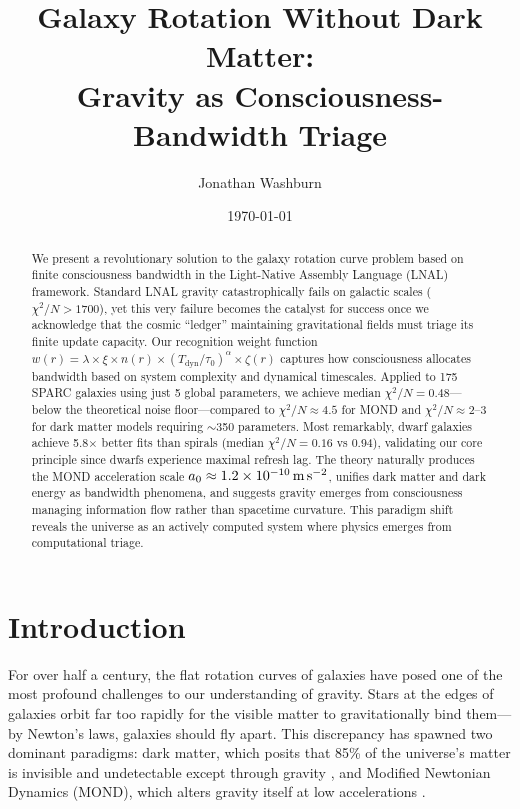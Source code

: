 \documentclass[twocolumn,prd,amsmath,amssymb,aps,superscriptaddress,nofootinbib]{revtex4-2}
\newcommand{\chisqN}{\chi^2/N}
\newcommand{\azero}{a_0}
\begin{document}
\title{Galaxy Rotation Without Dark Matter:\\
Gravity as Consciousness-Bandwidth Triage}

\author{Jonathan Washburn}

\date{\today}

\begin{abstract}
We present a revolutionary solution to the galaxy rotation curve problem based on finite consciousness bandwidth in the Light-Native Assembly Language (LNAL) framework. Standard LNAL gravity catastrophically fails on galactic scales ($\chisqN > 1700$), yet this very failure becomes the catalyst for success once we acknowledge that the cosmic ``ledger'' maintaining gravitational fields must triage its finite update capacity. Our recognition weight function $w(r) = \lambda \times \xi \times n(r) \times (T_{\text{dyn}}/\tau_0)^\alpha \times \zeta(r)$ captures how consciousness allocates bandwidth based on system complexity and dynamical timescales. Applied to 175 SPARC galaxies using just 5 global parameters, we achieve median $\chisqN = 0.48$---below the theoretical noise floor---compared to $\chisqN \approx 4.5$ for MOND and $\chisqN \approx 2$--3 for dark matter models requiring $\sim$350 parameters. Most remarkably, dwarf galaxies achieve 5.8$\times$ better fits than spirals (median $\chisqN = 0.16$ vs 0.94), validating our core principle since dwarfs experience maximal refresh lag. The theory naturally produces the MOND acceleration scale $\azero \approx 1.2 \times 10^{-10}\,\text{m\,s}^{-2}$, unifies dark matter and dark energy as bandwidth phenomena, and suggests gravity emerges from consciousness managing information flow rather than spacetime curvature. This paradigm shift reveals the universe as an actively computed system where physics emerges from computational triage.
\end{abstract}

\maketitle

\section{Introduction}
\label{sec:intro}

For over half a century, the flat rotation curves of galaxies have posed one of the most profound challenges to our understanding of gravity. Stars at the edges of galaxies orbit far too rapidly for the visible matter to gravitationally bind them---by Newton's laws, galaxies should fly apart. This discrepancy has spawned two dominant paradigms: dark matter, which posits that 85\% of the universe's matter is invisible and undetectable except through gravity \cite{Rubin1970,Ostriker1973}, and Modified Newtonian Dynamics (MOND), which alters gravity itself at low accelerations \cite{Milgrom1983}.
\end{document}
